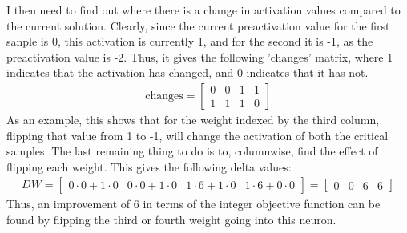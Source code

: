 I then need to find out where there is a change in activation values compared to the current solution. Clearly, since the current preactivation value for the first sanple is 0, this activation is currently 1, and for the second it is -1, as the preactivation value is -2. Thus, it gives the following 'changes' matrix, where 1 indicates that the activation has changed, and 0 indicates that it has not. 
\begin{align*}
    \text{changes} = 
    \begin{bmatrix}
        0 & 0 & 1 & 1 \\
        1 & 1 & 1 & 0
    \end{bmatrix}
\end{align*}
As an example, this shows that for the weight indexed by the third column, flipping that value from 1 to -1, will change the activation of both the critical samples. The last remaining thing to do is to, columnwise, find the effect of flipping each weight. This gives the following delta values:
\begin{align*}
    DW = 
    \begin{bmatrix}
        0 \cdot 0 + 1 \cdot 0 & 0 \cdot 0 + 1 \cdot 0 & 1 \cdot 6 + 1 \cdot 0 & 1 \cdot 6 + 0 \cdot 0
    \end{bmatrix}
    = 
    \begin{bmatrix}
        0 & 0 & 6 & 6
    \end{bmatrix}
\end{align*}
Thus, an improvement of 6 in terms of the integer objective function can be found by flipping the third or fourth weight going into this neuron. 



